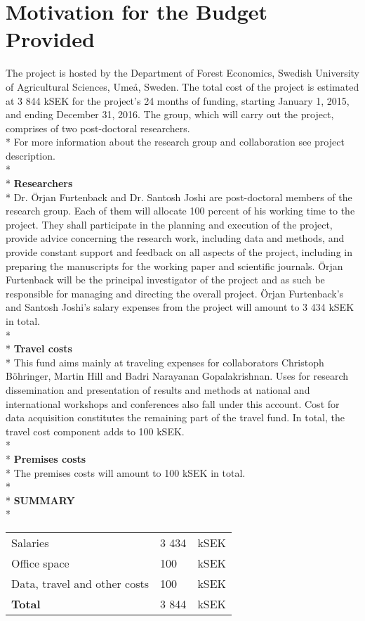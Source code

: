 \section{Motivation for the Budget Provided}
The project is hosted by the Department of Forest Economics, Swedish University of Agricultural Sciences, Umeå, Sweden. The total cost of the project is estimated at 3 844 kSEK for the project’s 24 months of funding, starting January 1, 2015, and ending December 31, 2016. The group, which will carry out the project, comprises of two post-doctoral researchers.\\*
For more information about the research group and collaboration see project description.\\*\\*
\textbf{Researchers}\\*
Dr. Örjan Furtenback and Dr. Santosh Joshi are post-doctoral members of the research group. Each of them will allocate 100 percent of his working time to the project. They shall participate in the planning and execution of the project, provide advice concerning the research work, including data and methods, and provide constant support and feedback on all aspects of the project, including in preparing the manuscripts for the working paper and scientific journals. Örjan Furtenback will be the principal investigator of the project and as such be responsible for managing and directing the overall project. Örjan Furtenback’s and Santosh Joshi’s salary expenses from the project will amount to 3 434 kSEK in total.\\*\\*
\textbf{Travel costs}\\*
This fund aims mainly at traveling expenses for collaborators Christoph Böhringer, Martin Hill and Badri Narayanan Gopalakrishnan. Uses for research dissemination and presentation of results and methods at national and international workshops and conferences also fall under this account. Cost for data acquisition constitutes the remaining part of the travel fund. In total, the travel cost component adds to 100 kSEK.\\*\\*
\textbf{Premises costs}\\*
The premises costs will amount to 100 kSEK in total.\\*\\*
\textbf{SUMMARY}\\*
\begin{tabular}{ l l c}
  Salaries & 3 434 & kSEK \\
  Office space & 100 & kSEK \\
  Data, travel and other costs & 100 & kSEK \\
  \textbf{Total} & 3 844 & kSEK \\
\end{tabular}


